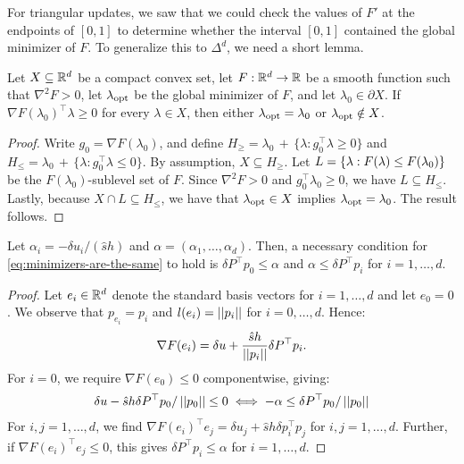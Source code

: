 \documentclass{article}
\begin{document}
For triangular updates, we saw that we could check the values of $F'$
at the endpoints of $[0, 1]$ to determine whether the interval
$[0, 1]$ contained the global minimizer of $F$. To generalize this to
$\Delta^d$, we need a short lemma.

\begin{lemma}
  Let $X \subseteq \mathbb{R}^d$ be a compact convex set, let
  $F : \mathbb{R}^d \to \mathbb{R}$ be a smooth function such that $\nabla^2 F > 0$,
  let $\lambda_{\operatorname{opt}}$ be the global minimizer of $F$, and let
  $\lambda_0 \in \partial X$. If
  $\nabla F(\lambda_0)^\top \lambda \geq 0$ for every $\lambda \in X$,
  then either $\lambda_{\operatorname{opt}} = \lambda_0$ or $\lambda_{\operatorname{opt}} \notin X$.
\end{lemma}

\begin{proof}
  Write $g_0 = \nabla F(\lambda_0)$, and define
  $H_{\geq} = \lambda_0 \,+\, \{\lambda: g_0^\top \lambda \geq 0\}$
  and
  $H_{\leq} = \lambda_0 \,+\, \{\lambda: g_0^\top \lambda \leq 0\}$.
  By assumption, $X \subseteq H_{\geq}$. Let
  $L = \left\{\lambda : F(\lambda) \leq F(\lambda_0)\right\}$ be the
  $F(\lambda_0)$-sublevel set of $F$. Since $\nabla^2 F > 0$ and
  $g_0^\top \lambda_0 \geq 0$, we have $L \subseteq H_{\leq}$. Lastly,
  because $X \cap L \subseteq H_{\leq}$, we have that
  $\lambda_{\operatorname{opt}} \in X$ implies $\lambda_{\operatorname{opt}} = \lambda_0$. The result
  follows.
\end{proof}

\begin{theorem}
  Let $\alpha_i = -\delta u_i/(\hat{s}h)$ and
  $\alpha = (\alpha_1, \hdots, \alpha_d)$. Then, a necessary condition
  for \cref{eq:minimizers-are-the-same} to hold is
  $\delta P^\top p_0 \leq \alpha$ and $\alpha \leq \delta P^\top p_i$
  for $i = 1, \hdots, d$.
\end{theorem}

\begin{proof}
  Let $e_i \in \mathbb{R}^d$ denote the standard basis vectors for
  $i = 1, \hdots, d$ and let $e_0 = 0$. We observe that
  $p_{e_i} = p_i$ and $l(e_i) = \left|\left|p_i\right|\right|$ for $i = 0, \hdots,
  d$. Hence:
  \begin{align*}
    \nabla F(e_i) = \delta u + \frac{\hat{s}h}{\left|\left|p_i\right|\right|} \delta P^\top p_i.
  \end{align*}
  For $i = 0$, we require $\nabla F(e_0) \leq 0$ componentwise, giving:
  \begin{align*}
    \delta u - \hat{s}h \delta P^\top p_0/\left|\left|p_0\right|\right| \leq 0  \iff -\alpha \leq \delta P^\top p_0/\left|\left|p_0\right|\right|
  \end{align*}
  For $i, j = 1, \hdots, d$, we find
  $\nabla F(e_i)^\top e_j = \delta u_j + \hat{s} h \delta p_i^\top
  p_j$ for $i, j = 1, \hdots, d$. Further, if
  $\nabla F(e_i)^\top e_j \leq 0$, this gives
  $\delta P^\top p_i \leq \alpha$ for $i = 1, \hdots, d$.
\end{proof}
\end{document}
